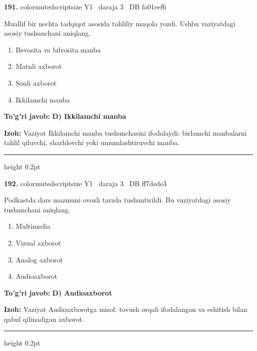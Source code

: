 \documentclass[10pt,a4paper,oneside]{article}
\begin{document}
\noindent\textbf{\color{ink}191.}  {color{muted}scriptsize Y1 \textbullet\ daraja 3 \textbullet\ DB fa01eef6}
\par
Muallif bir nechta tadqiqot asosida tahliliy maqola yozdi. Ushbu vaziyatdagi asosiy tushunchani aniqlang.
\begin{enumerate}[label=\Alph*),leftmargin=9mm]
\item Bevosita va bilvosita manba
\item Matnli axborot
\item Sonli axborot
\item Ikkilamchi manba
\end{enumerate}
\begin{tcolorbox}[enhanced,breakable,colback=teal!4,colframe=teal!50!black,boxrule=0.5pt,arc=1.1mm,left=3mm,right=3mm,top=1.7mm,bottom=1.7mm,before skip=2mm,after skip=2mm]
\textbf{\color{teal}To'g'ri javob:} \textbf{D) Ikkilamchi manba}
\par\smallskip
\textbf{Izoh:} Vaziyat Ikkilamchi manba tushunchasini ifodalaydi: birlamchi manbalarni tahlil qiluvchi, sharhlovchi yoki umumlashtiruvchi manba.
\end{tcolorbox}
\vspace{2mm}\hrule height 0.2pt \vspace{3mm}

\noindent\textbf{\color{ink}192.}  {color{muted}scriptsize Y1 \textbullet\ daraja 3 \textbullet\ DB ff7dede3}
\par
Podkastda dars mazmuni ovozli tarzda tushuntirildi. Bu vaziyatdagi asosiy tushunchani aniqlang.
\begin{enumerate}[label=\Alph*),leftmargin=9mm]
\item Multimedia
\item Vizual axborot
\item Analog axborot
\item Audioaxborot
\end{enumerate}
\begin{tcolorbox}[enhanced,breakable,colback=teal!4,colframe=teal!50!black,boxrule=0.5pt,arc=1.1mm,left=3mm,right=3mm,top=1.7mm,bottom=1.7mm,before skip=2mm,after skip=2mm]
\textbf{\color{teal}To'g'ri javob:} \textbf{D) Audioaxborot}
\par\smallskip
\textbf{Izoh:} Vaziyat Audioaxborotga misol: tovush orqali ifodalangan va eshitish bilan qabul qilinadigan axborot.
\end{tcolorbox}
\vspace{2mm}\hrule height 0.2pt \vspace{3mm}
\end{document}
